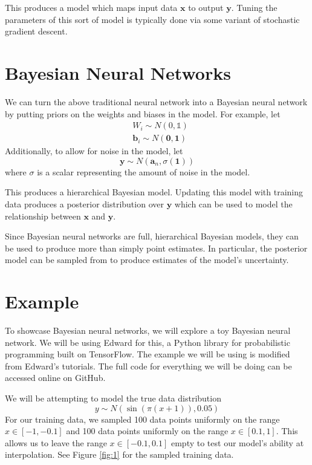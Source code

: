 \documentclass[
    preprint,
    12pt,
    letterpaper,
    longbibliography,
    nofootinbib,
    amsmath,
    amssymb,
    amsfonts,
]{revtex4-1}
\newcommand{\bbm}[1]{\mathbb{#1}}
\begin{document}
This produces a model which maps input data $\bm x$ to output $\bm y$. Tuning the parameters of this sort of model is typically done via some variant of stochastic gradient descent.

\section{Bayesian Neural Networks}

We can turn the above traditional neural network into a Bayesian neural network by putting priors on the weights and biases in the model. For example, let
\begin{align*}
    & W_i \sim N(0, \bbm 1) \\
    & \bm b_i \sim N(\bm 0, \bm 1)
\end{align*}
Additionally, to allow for noise in the model, let
\[
    \bm y \sim N(\bm a_n, \sigma (\bm 1))
\]
where $\sigma$ is a scalar representing the amount of noise in the model.

This produces a hierarchical Bayesian model. Updating this model with training data produces a posterior distribution over $\bm y$ which can be used to model the relationship between $\bm x$ and $\bm y$.

Since Bayesian neural networks are full, hierarchical Bayesian models, they can be used to produce more than simply point estimates. In particular, the posterior model can be sampled from to produce estimates of the model's uncertainty.

\section{Example}

To showcase Bayesian neural networks, we will explore a toy Bayesian neural network. We will be using Edward for this, a Python library for probabilistic programming built on TensorFlow.\cite{edward} The example we will be using is modified from Edward's tutorials.\cite{tutorial} The full code for everything we will be doing can be accessed online on GitHub.\cite{code}

We will be attempting to model the true data distribution
\[
    y \sim N(\sin(\pi(x+1)), 0.05)
\]
For our training data, we sampled 100 data points uniformly on the range $x \in [-1, -0.1]$ and 100 data points uniformly on the range $x \in [0.1, 1]$. This allows us to leave the range $x \in [-0.1, 0.1]$ empty to test our model's ability at interpolation. See Figure \ref{fig:1} for the sampled training data.
\end{document}
